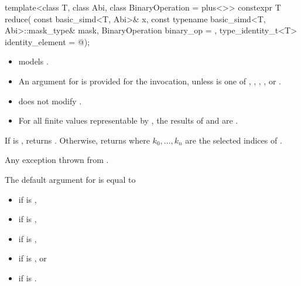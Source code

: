 \begin{wgText}[P1928R12]
  \setcounter{Paras}{5}
\begin{itemdecl}
template<class T, class Abi, class BinaryOperation = plus<>>
  constexpr T reduce(
    const basic_simd<T, Abi>& x, const typename basic_simd<T, Abi>::mask_type& mask,
    BinaryOperation binary_op = {}, type_identity_t<T> identity_element = @\seebelow@);
\end{itemdecl}

\begin{itemdescr}
  \pnum\constraints
  \begin{itemize}
    \item {} models .

    \item An argument for  is provided for the invocation, unless
       is one of , , ,
      , or .
  \end{itemize}

  \pnum\expects
  \begin{itemize}
    \item {} does not modify .

    \item For all finite values  representable by , the results of
       and
       are .
  \end{itemize}

  \pnum\returns
  If  is , returns .
  Otherwise, returns  where $k_0, \ldots, k_n$ are the selected indices of
  .

  \pnum\throws
  Any exception thrown from .

  \pnum\remarks
  The default argument for  is equal to
  \begin{itemize}
    \item {} if  is ,
    \item {} if  is ,
    \item {} if  is ,
    \item {} if  is , or
    \item {} if  is .
  \end{itemize}
\end{itemdescr}
\end{wgText}

